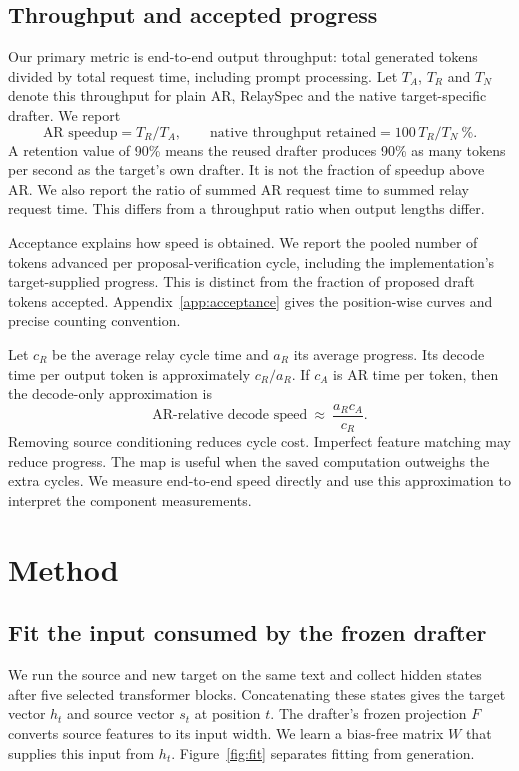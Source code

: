 \documentclass{article}
\begin{document}
\subsection{Throughput and accepted progress}
\label{sec:cost}

Our primary metric is end-to-end output throughput: total generated tokens
divided by total request time, including prompt processing. Let $T_A$,
$T_R$ and $T_N$ denote this throughput for plain AR, RelaySpec and the
native target-specific drafter. We report
\begin{equation}
\text{AR speedup}=T_R/T_A,\qquad
\text{native throughput retained}=100\,T_R/T_N\ \%.
\label{eq:metrics}
\end{equation}
A retention value of 90\% means the reused drafter produces 90\% as many
tokens per second as the target's own drafter. It is not the fraction of
speedup above AR. We also report the ratio of summed AR request time to
summed relay request time. This differs from a throughput ratio when
output lengths differ.

Acceptance explains how speed is obtained. We report the pooled number
of tokens advanced per proposal-verification cycle, including the
implementation's target-supplied progress. This is distinct from the
fraction of proposed draft tokens accepted. Appendix~\ref{app:acceptance}
gives the position-wise curves and precise counting convention.

Let $c_R$ be the average relay cycle time and $a_R$ its average progress.
Its decode time per output token is approximately $c_R/a_R$.
If $c_A$ is AR time per token, then the decode-only approximation is
\begin{equation}
\text{AR-relative decode speed}\ \approx\ \frac{a_R c_A}{c_R}.
\label{eq:cycle}
\end{equation}
Removing source conditioning reduces cycle cost. Imperfect feature
matching may reduce progress. The map is useful when the saved computation
outweighs the extra cycles. We measure end-to-end speed directly and use
this approximation to interpret the component measurements.

\section{Method}
\label{sec:method}

\subsection{Fit the input consumed by the frozen drafter}
We run the source and new target on the same text and collect hidden
states after five selected transformer blocks. Concatenating these states
gives the target vector $h_t$ and source vector $s_t$ at position $t$.
The drafter's frozen projection $F$ converts source features to its input
width. We learn a bias-free matrix $W$ that supplies this input from $h_t$.
Figure~\ref{fig:fit} separates fitting from generation.
\end{document}
